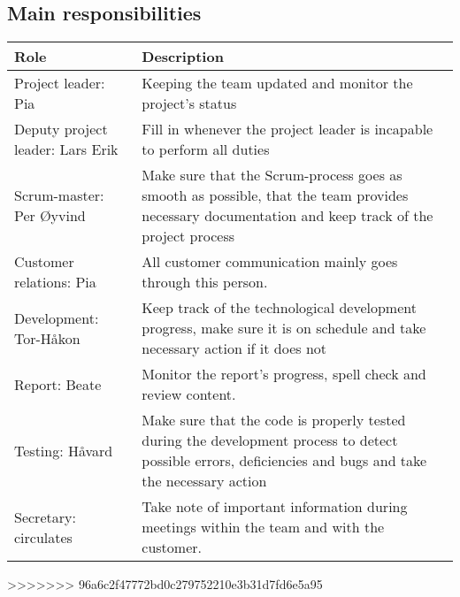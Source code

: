 \subsection{Main responsibilities}
\begin{table}[H]
\centering
{}
\begin{tabular}{|l|p{9.4cm}|}
\hline
\textbf{Role} & \textbf{Description}\\\hline
Project leader: Pia & Keeping the team updated and monitor the project's status\\\hline
Deputy project leader: Lars Erik & Fill in whenever the project leader is incapable to perform all duties\\\hline
Scrum-master: Per Øyvind & Make sure that the Scrum-process goes as smooth as possible, that the team provides necessary documentation and keep track of the project process\\\hline
Customer relations: Pia & All customer communication mainly goes through this person.\\\hline
Development: Tor-Håkon & Keep track of the technological development progress, make sure it is on schedule and take necessary action if it does not\\\hline
Report: Beate & Monitor the report's progress, spell check and review content.\\\hline
Testing: Håvard & Make sure that the code is properly tested during the development process to detect possible errors, deficiencies and bugs and take the necessary action \\\hline
Secretary: circulates & Take note of important information during meetings within the team and with the customer.\\\hline
\end{tabular}
>>>>>>> 96a6c2f47772bd0c279752210e3b31d7fd6e5a95
\end{table}
